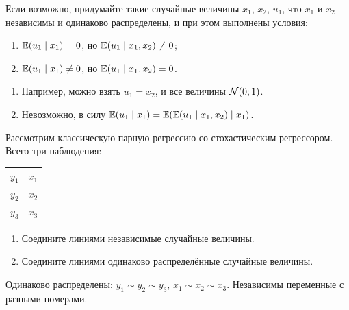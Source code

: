 \begin{problem}
  Если возможно, придумайте такие случайные величины $x_1$, $x_2$, $u_1$, что $x_1$ и $x_2$ независимы и одинаково распределены,
  и при этом выполнены условия:
  \begin{enumerate}
    \item $\operatorname{\mathbb{E}}(u_1 \mid x_1)=0$, но $\operatorname{\mathbb{E}}(u_1 \mid x_1, x_2) \neq 0$;
    \item $\operatorname{\mathbb{E}}(u_1 \mid x_1)\neq 0$, но $\operatorname{\mathbb{E}}(u_1 \mid x_1, x_2) = 0$.
  \end{enumerate}
\begin{sol}
  \begin{enumerate}
    \item Например, можно взять $u_1=x_2$, и все величины $\mathcal{N}(0;1)$.
    \item Невозможно, в силу $\operatorname{\mathbb{E}}(u_1 \mid x_1) = \operatorname{\mathbb{E}}(\operatorname{\mathbb{E}}(u_1 \mid x_1, x_2) \mid x_1)$.
  \end{enumerate}

  
\end{sol}
\end{problem}

\begin{problem}
 Рассмотрим классическую парную регрессию со стохастическим регрессором. Всего три наблюдения:

 \begin{tabular}{rr}
 \toprule
 $y_1$ & $x_1$ \\
 $y_2$ & $x_2$ \\
 $y_3$ & $x_3$ \\
 \bottomrule
 \end{tabular}

\begin{enumerate}
 \item Соедините линиями независимые случайные величины.
 \item Соедините линиями одинаково распределённые случайные величины.
\end{enumerate}

\begin{sol}
  Одинаково распределены: $y_1 \sim y_2 \sim y_3$, $x_1 \sim x_2 \sim x_3$. Независимы переменные с разными номерами.
\end{sol}
\end{problem}

